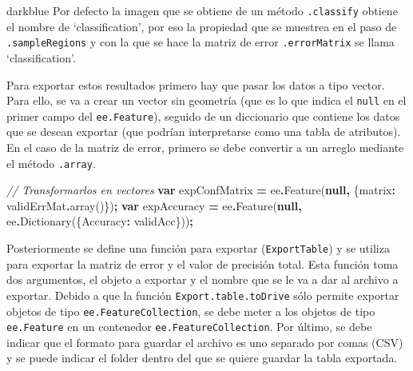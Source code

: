 \documentclass[
  12pt,
  letterpaper,
  twoside]{book}
\newenvironment{Shaded}{\begin{snugshade}}{\end{snugshade}}
\newcommand{\CommentTok}[1]{\textcolor[rgb]{0.56,0.35,0.01}{\textit{#1}}}
\newcommand{\DataTypeTok}[1]{\textcolor[rgb]{0.13,0.29,0.53}{#1}}
\newcommand{\FunctionTok}[1]{\textcolor[rgb]{0.00,0.00,0.00}{#1}}
\newcommand{\KeywordTok}[1]{\textcolor[rgb]{0.13,0.29,0.53}{\textbf{#1}}}
\newcommand{\NormalTok}[1]{#1}
\newcommand{\OperatorTok}[1]{\textcolor[rgb]{0.81,0.36,0.00}{\textbf{#1}}}
\begin{document}
\begin{bluebox2}

\begin{awesomeblock}{5pt}{\faLightbulb}{darkblue}
Por defecto la imagen que se obtiene de un método \texttt{.classify} obtiene el nombre de `classification', por eso la propiedad que se muestrea en el paso de \texttt{.sampleRegions} y con la que se hace la matriz de error \texttt{.errorMatrix} se llama `classification'.

\end{awesomeblock}

\end{bluebox2}

Para exportar estos resultados primero hay que pasar los datos a tipo vector. Para ello, se va a crear un vector sin geometría (que es lo que indica el \texttt{null} en el primer campo del \texttt{ee.Feature}), seguido de un diccionario que contiene los datos que se desean exportar (que podrían interpretarse como una tabla de atributos). En el caso de la matriz de error, primero se debe convertir a un arreglo mediante el método \texttt{.array}.

\begin{Shaded}
\begin{Highlighting}[]
\CommentTok{// Transformarlos en vectores}
\KeywordTok{var}\NormalTok{ expConfMatrix }\OperatorTok{=}\NormalTok{  ee}\OperatorTok{.}\FunctionTok{Feature}\NormalTok{(}\KeywordTok{null}\OperatorTok{,}\NormalTok{ \{}\DataTypeTok{matrix}\OperatorTok{:}\NormalTok{ validErrMat}\OperatorTok{.}\FunctionTok{array}\NormalTok{()\})}\OperatorTok{;}
\KeywordTok{var}\NormalTok{ expAccuracy }\OperatorTok{=}\NormalTok{ ee}\OperatorTok{.}\FunctionTok{Feature}\NormalTok{(}\KeywordTok{null}\OperatorTok{,}\NormalTok{ ee}\OperatorTok{.}\FunctionTok{Dictionary}\NormalTok{(\{}\DataTypeTok{Accuracy}\OperatorTok{:}\NormalTok{ validAcc\}))}\OperatorTok{;}
\end{Highlighting}
\end{Shaded}

Posteriormente se define una función para exportar (\texttt{ExportTable}) y se utiliza para exportar la matriz de error y el valor de precisión total. Esta función toma dos argumentos, el objeto a exportar y el nombre que se le va a dar al archivo a exportar. Debido a que la función \texttt{Export.table.toDrive} sólo permite exportar objetos de tipo \texttt{ee.FeatureCollection}, se debe meter a los objetos de tipo \texttt{ee.Feature} en un contenedor \texttt{ee.FeatureCollection}. Por último, se debe indicar que el formato para guardar el archivo es uno separado por comas (CSV) y se puede indicar el folder dentro del que se quiere guardar la tabla exportada.
\end{document}
